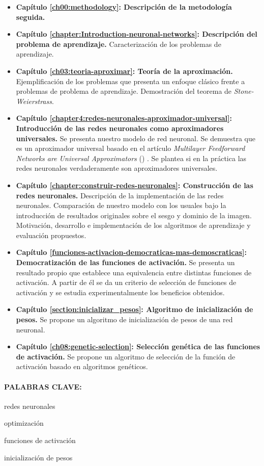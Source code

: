 \begin{itemize}
    \item \textbf{Capítulo \ref{ch00:methodology}: Descripción de la metodología seguida.} 
    \item \textbf{Capítulo \ref{chapter:Introduction-neuronal-networks}: Descripción del problema de aprendizaje.} Caracterización de los problemas de aprendizaje.
    \item \textbf{Capítulo \ref{ch03:teoria-aproximar}: Teoría de la aproximación.} Ejemplificación de los problemas que presenta un enfoque clásico frente a problemas de problema de aprendizaje.  Demostración del teorema de \textit{Stone-Weierstrass}.
    \item \textbf{Capítulo \ref{chapter4:redes-neuronales-aproximador-universal}: Introducción de las redes neuronales como aproximadores universales.} Se presenta nuestro modelo de red neuronal. Se demuestra que es un aproximador universal basado en el artículo 
    \textit{Multilayer Feedforward Networks are Universal Approximators} (\cite{HORNIK1989359}) . Se plantea si en la práctica las redes neuronales 
    verdaderamente son aproximadores universales.
    \item \textbf{Capítulo \ref{chapter:construir-redes-neuronales}: Construcción de las redes neuronales.} Descripción de la implementación de las redes neuronales. 
    Comparación de nuestro modelo con los usuales bajo la introducción de resultados originales sobre el sesgo y dominio de la imagen. Motivación, desarrollo e implementación de los algoritmos de aprendizaje y evaluación propuestos.
    \item \textbf{Capítulo \ref{funciones-activacion-democraticas-mas-demoscraticas}: Democratización de las funciones de activación.} Se presenta un resultado propio que establece una equivalencia entre distintas funciones de activación. A partir de él se da un criterio de selección de funciones de activación y se estudia experimentalmente los beneficios obtenidos. 
    \item \textbf{Capítulo \ref{section:inicializar_pesos}: Algoritmo de inicialización de pesos.} Se propone un algoritmo de inicialización de pesos de una red neuronal.
    \item \textbf{Capítulo \ref{ch08:genetic-selection}: Selección genética de las funciones de activación.} Se propone un algoritmo de selección de la función de activación basado en algoritmos genéticos. 
\end{itemize}

\paragraph{PALABRAS CLAVE:}
\begin{itemize*}[label=,itemsep=1em,itemjoin=\hspace{1em}]
  \item redes neuronales
  \item optimización 
  \item funciones de activación 
  \item inicialización de pesos
\end{itemize*}

\endinput
